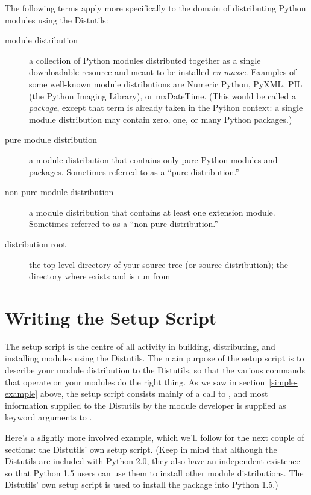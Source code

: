 \documentclass{howto}
\begin{document}
The following terms apply more specifically to the domain of
distributing Python modules using the Distutils:
\begin{description}
\item[module distribution] a collection of Python modules distributed
  together as a single downloadable resource and meant to be installed
  \emph{en masse}.  Examples of some well-known module distributions are
  Numeric Python, PyXML, PIL (the Python Imaging Library), or
  mxDateTime.  (This would be called a \emph{package}, except that term
  is already taken in the Python context: a single module distribution
  may contain zero, one, or many Python packages.)
\item[pure module distribution] a module distribution that contains only
  pure Python modules and packages.  Sometimes referred to as a ``pure
  distribution.''
\item[non-pure module distribution] a module distribution that contains
  at least one extension module.  Sometimes referred to as a ``non-pure
  distribution.''
\item[distribution root] the top-level directory of your source tree (or 
  source distribution); the directory where  exists and
  is run from
\end{description}


\section{Writing the Setup Script}
\label{setup-script}

The setup script is the centre of all activity in building,
distributing, and installing modules using the Distutils.  The main
purpose of the setup script is to describe your module distribution to
the Distutils, so that the various commands that operate on your modules
do the right thing.  As we saw in section~\ref{simple-example} above,
the setup script consists mainly of a call to , and
most information supplied to the Distutils by the module developer is
supplied as keyword arguments to .

Here's a slightly more involved example, which we'll follow for the next
couple of sections: the Distutils' own setup script.  (Keep in mind that
although the Distutils are included with Python 2.0, they also have an
independent existence so that Python 1.5 users can use them to install
other module distributions.  The Distutils' own setup script is used to
install the package into Python 1.5.)
\end{document}
